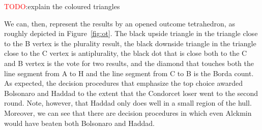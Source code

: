 \documentclass[hidelinks,11pt]{article} \usepackage[utf8]{inputenc}
\begin{document}


\textcolor{red}{TODO}:explain the coloured triangles


We can, then, represent the results by an opened outcome tetrahedron, as roughly
depicted in Figure~\ref{fig:ot}. The black upside triangle in the triangle close
to the B vertex is the plurality result, the black downside triangle in the
triangle close to the C vertex is antiplurality, the black dot that is close
both to the C and B vertex is the vote for two results, and the diamond that
touches both the line segment from A to H and the line segment from C to B is
the Borda count. As expected, the decision procedures that emphasize the top
choice awarded Bolsonaro and Haddad to the extent that the Condorcet loser went
to the second round. Note, however, that Haddad only does well in a small region
of the hull. Moreover, we can see that there are decision procedures in which
even Alckmin would have beaten both Bolsonaro and Haddad.

\end{document}
